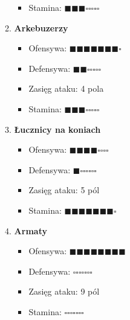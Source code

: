 \documentclass[oneside]{lmdEN}%
\begin{document}
\begin{enumerate}
\begin{enumerate}
\begin{itemize}
                        \item Stamina: $\blacksquare\blacksquare\blacksquare\square\square\square\square\square$
                    \end{itemize}
              \item \textbf{Arkebuzerzy}
                     \begin{itemize}
                        \item Ofensywa: $\blacksquare\blacksquare\blacksquare\blacksquare\blacksquare\blacksquare\blacksquare\square$
                        \item Defensywa: $\blacksquare\blacksquare\square\square\square\square\square$
                        \item Zasięg ataku: 4 pola
                        \item Stamina: $\blacksquare\blacksquare\blacksquare\square\square\square\square\square$
                    \end{itemize}
              \item \textbf{Łucznicy na koniach}
                    \begin{itemize}
                        \item Ofensywa: $\blacksquare\blacksquare\blacksquare\blacksquare\square\square\square\square$
                        \item Defensywa: $\blacksquare\square\square\square\square\square\square$
                        \item Zasięg ataku: 5 pól
                        \item Stamina: $\blacksquare\blacksquare\blacksquare\blacksquare\blacksquare\blacksquare\blacksquare\square$
                    \end{itemize}
              \item \textbf{Armaty}
                    \begin{itemize}
                        \item Ofensywa: $\blacksquare\blacksquare\blacksquare\blacksquare\blacksquare\blacksquare\blacksquare\blacksquare$
                        \item Defensywa: $\square\square\square\square\square\square\square$
                        \item Zasięg ataku: 9 pól
                        \item Stamina: $\square\square\square\square\square\square\square$
                    \end{itemize}
          \end{enumerate}

\end{enumerate}
\end{document}
